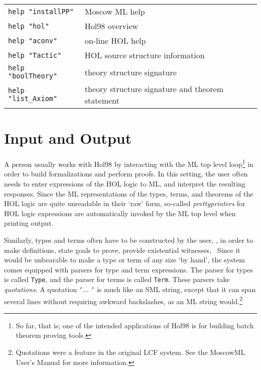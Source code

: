 \documentclass[12pt,fleqn,layout,a4paper]{report}
\begin{document}
 \begin{table}[h]
\begin{center}
 \begin{tabular}{|l|l|} \hline
  \verb+help "installPP"+ & Moscow ML help \\
  \verb+help "hol"+ &  Hol98 overview \\
  \verb+help "aconv"+ &  on-line HOL help \\
  \verb+help "Tactic"+ & HOL source structure information \\
  \verb+help "boolTheory"+ &  theory structure signature \\
  \verb+help "list_Axiom"+ & theory structure signature and theorem
 statement \\ \hline
 \end{tabular}
\end{center}
 \end{table}

\section{Input and Output}

A person usually works with Hol98  by interacting with the ML top level
loop\footnote{So far, that is; one of the intended applications of Hol98
is for building batch theorem proving tools.} in order to build
formalizations and perform proofs. In this setting, the user often needs
to enter expressions of the HOL logic to ML, and interpret the resulting
responses. Since the ML representations of the types, terms, and
theorems of the HOL logic are quite unreadable in their `raw' form,
so-called {\it prettyprinters\/} for HOL logic expressions are
automatically invoked by the ML top level when printing output.

Similarly, types and terms often have to be constructed by the user,
\eg, in order to make definitions, state goals to prove, provide
existential witnesses, \etc\ Since it would be unbearable to make a type
or term of any size `by hand', the system comes equipped with parsers
for type and term expressions. The parser for types is called
\verb+Type+, and the parser for terms is called \verb+Term+. These
parsers take {\it quotations\/}.  A quotation {\tt `}$\ldots$ {\tt `} is
much like an SML string, except that it can span several lines without
requiring awkward backslashes, as an ML string
would.\footnote{Quotations were a feature in the original LCF
system. See the MoscowML User's Manual for more information.}
\end{document}
